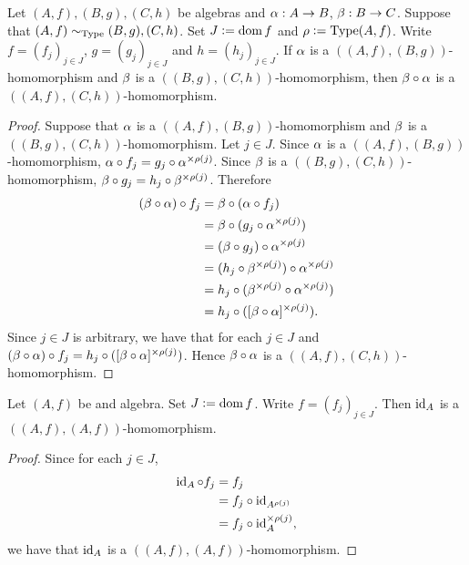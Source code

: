 \documentclass{book}
\begin{document}
	\begin{ex}
		Let $(A, f), (B, g), (C, h)$ be algebras and $\alpha:A \rightarrow B$, $\beta:B \rightarrow C$. Suppose that $(A, f) \sim_{\operatorname{Type}} (B, g), (C, h)$. Set $J \vcentcolon= \operatorname{dom} f$ and $\rho \vcentcolon= \operatorname{Type}(A, f)$. Write $f = (f_j)_{j \in J}$, $g = (g_j)_{j \in J}$ and $h = (h_j)_{j \in J}$. If $\alpha$ is a $((A,f), (B,g))$-homomorphism and $\beta$ is a $((B,g), (C,h))$-homomorphism, then $\beta \circ \alpha$ is a $((A,f), (C,h))$-homomorphism.
	\end{ex}
	
	\begin{proof}
		Suppose that $\alpha$ is a $((A,f), (B,g))$-homomorphism and $\beta$ is a $((B,g), (C,h))$-homomorphism. Let $j \in J$. Since $\alpha$ is a $((A,f), (B,g))$-homomorphism, $\alpha \circ f_j = g_j \circ \alpha^{\times \rho(j)}$. Since $\beta$ is a $((B,g), (C,h))$-homomorphism, $\beta \circ g_j = h_j \circ \beta^{\times \rho(j)}$. Therefore
		\begin{align*}
			(\beta \circ \alpha) \circ f_j
			& = \beta \circ (\alpha \circ f_j) \\
			& = \beta \circ (g_j \circ \alpha^{\times \rho(j)}) \\
			& = (\beta \circ g_j) \circ \alpha^{\times \rho(j)} \\
			& = (h_j \circ \beta^{\times \rho(j)}) \circ \alpha^{\times \rho(j)} \\
			& = h_j \circ (\beta^{\times \rho(j)} \circ \alpha^{\times \rho(j)}) \\
			& = h_j \circ ([\beta \circ \alpha]^{\times \rho(j)}).
		\end{align*}
		Since $j \in J$ is arbitrary, we have that for each $j \in J$ and $(\beta \circ \alpha) \circ f_j = h_j \circ ([\beta \circ \alpha]^{\times \rho(j)})$. Hence $\beta \circ \alpha$ is a $((A,f), (C,h))$-homomorphism.
	\end{proof}
	
	\begin{ex}
		Let $(A, f)$ be and algebra. Set $J \vcentcolon= \operatorname{dom} f$. Write $f = (f_j)_{j \in J}$. Then $\operatorname{id}_A$ is a $((A,f), (A,f))$-homomorphism.
	\end{ex}
	
	\begin{proof}
		Since for each $j \in J$,
		\begin{align*}
			\operatorname{id}_A \circ f_j
			& = f_j \\
			& = f_j \circ \operatorname{id}_{A^{\rho(j)}} \\
			& = f_j \circ \operatorname{id}_A^{\times \rho(j)},
		\end{align*}
		we have that $\operatorname{id}_A$ is a $((A,f), (A,f))$-homomorphism.
	\end{proof}
	
\end{document}
